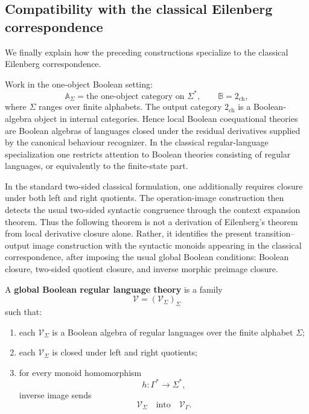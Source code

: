 \subsection{Compatibility with the classical Eilenberg correspondence}
\label{subsec:classical-eilenberg-compatibility}

We finally explain how the preceding constructions specialize to the classical
Eilenberg correspondence.

Work in the one-object Boolean setting:
\[
    \mathbb A_\Sigma
    =
    \text{the one-object category on }\Sigma^*,
    \qquad
    \mathbb B=2_{\mathrm{ch}},
\]
where \(\Sigma\) ranges over finite alphabets. The output category
\(2_{\mathrm{ch}}\) is a Boolean-algebra object in internal categories. Hence
local Boolean coequational theories are Boolean algebras of languages closed
under the residual derivatives supplied by the canonical behaviour recognizer.
In the classical regular-language specialization one restricts attention to
Boolean theories consisting of regular languages, or equivalently to the
finite-state part.

In the standard two-sided classical formulation, one additionally requires
closure under both left and right quotients. The operation-image construction
then detects the usual two-sided syntactic congruence through the context
expansion theorem. Thus the following theorem is not a derivation of
Eilenberg's theorem from local derivative closure alone. Rather, it identifies
the present transition--output image construction with the syntactic monoids
appearing in the classical correspondence, after imposing the usual global
Boolean conditions: Boolean closure, two-sided quotient closure, and inverse
morphic preimage closure.

\begin{definition}
\label{def:global-boolean-regular-language-theory}
    A \textbf{global Boolean regular language theory} is a family
    \[
        \mathcal V=(\mathcal V_\Sigma)_\Sigma
    \]
    such that:
    \begin{enumerate}
        \item each \(\mathcal V_\Sigma\) is a Boolean algebra of regular
        languages over the finite alphabet \(\Sigma\);
        \item each \(\mathcal V_\Sigma\) is closed under left and right
        quotients;
        \item for every monoid homomorphism
        \[
            h:\Gamma^*\to\Sigma^*,
        \]
        inverse image sends
        \[
            \mathcal V_\Sigma
            \quad\text{into}\quad
            \mathcal V_\Gamma.
        \]
    \end{enumerate}
\end{definition}

